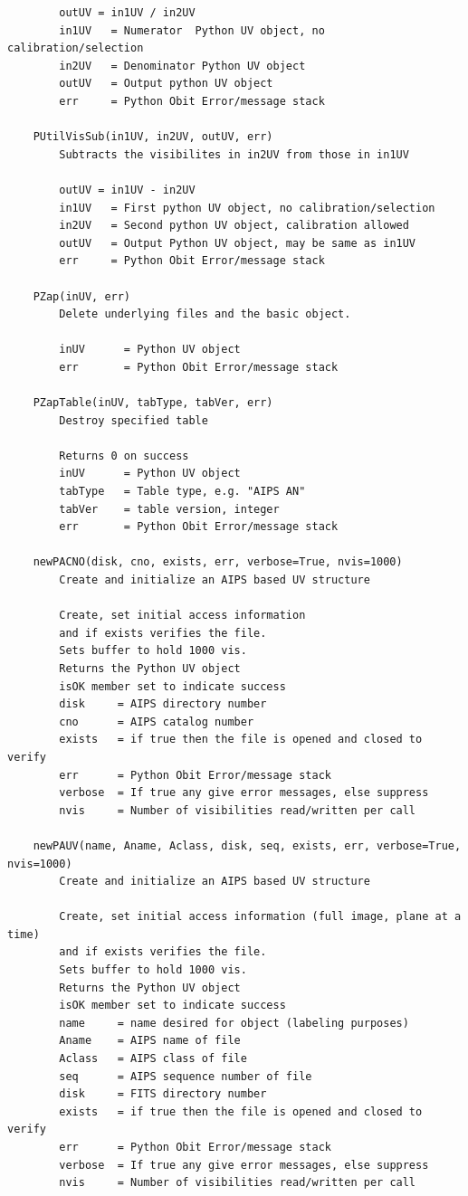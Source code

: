 \documentclass[11pt]{report}
\begin{document}
\begin{verbatim}
        outUV = in1UV / in2UV
        in1UV   = Numerator  Python UV object, no calibration/selection
        in2UV   = Denominator Python UV object
        outUV   = Output python UV object
        err     = Python Obit Error/message stack
    
    PUtilVisSub(in1UV, in2UV, outUV, err)
        Subtracts the visibilites in in2UV from those in in1UV
        
        outUV = in1UV - in2UV
        in1UV   = First python UV object, no calibration/selection
        in2UV   = Second python UV object, calibration allowed
        outUV   = Output Python UV object, may be same as in1UV
        err     = Python Obit Error/message stack
    
    PZap(inUV, err)
        Delete underlying files and the basic object.
        
        inUV      = Python UV object
        err       = Python Obit Error/message stack
    
    PZapTable(inUV, tabType, tabVer, err)
        Destroy specified table
        
        Returns 0 on success
        inUV      = Python UV object
        tabType   = Table type, e.g. "AIPS AN"
        tabVer    = table version, integer
        err       = Python Obit Error/message stack
    
    newPACNO(disk, cno, exists, err, verbose=True, nvis=1000)
        Create and initialize an AIPS based UV structure
        
        Create, set initial access information 
        and if exists verifies the file.
        Sets buffer to hold 1000 vis.
        Returns the Python UV object
        isOK member set to indicate success
        disk     = AIPS directory number
        cno      = AIPS catalog number
        exists   = if true then the file is opened and closed to verify
        err      = Python Obit Error/message stack
        verbose  = If true any give error messages, else suppress
        nvis     = Number of visibilities read/written per call
     
    newPAUV(name, Aname, Aclass, disk, seq, exists, err, verbose=True, nvis=1000)
        Create and initialize an AIPS based UV structure
        
        Create, set initial access information (full image, plane at a time)
        and if exists verifies the file.
        Sets buffer to hold 1000 vis.
        Returns the Python UV object
        isOK member set to indicate success
        name     = name desired for object (labeling purposes)
        Aname    = AIPS name of file
        Aclass   = AIPS class of file
        seq      = AIPS sequence number of file
        disk     = FITS directory number
        exists   = if true then the file is opened and closed to verify
        err      = Python Obit Error/message stack
        verbose  = If true any give error messages, else suppress
        nvis     = Number of visibilities read/written per call
     

\end{verbatim}
\end{document}
